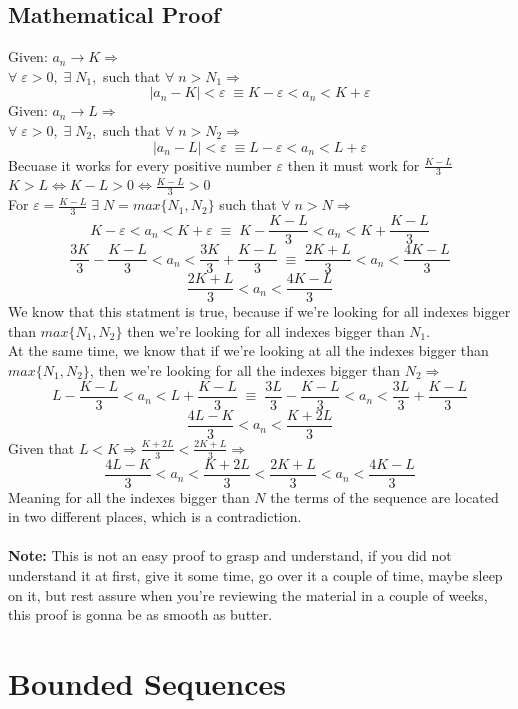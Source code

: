\subsection{Mathematical Proof}
Given: $a_n\rightarrow K \Longrightarrow$\\
$\forall\; \varepsilon>0,\; \exists\; N_1,$ such that $\forall\;n>N_1\Longrightarrow$
\[
    |a_n-K|<\varepsilon\; \equiv K-\varepsilon<a_n<K+\varepsilon
\]
Given: $a_n\rightarrow L \Longrightarrow$\\
$\forall\; \varepsilon>0,\; \exists\; N_2,$ such that $\forall\;n>N_2\Longrightarrow$
\[
    |a_n-L|<\varepsilon\; \equiv L-\varepsilon<a_n<L+\varepsilon
\]
Becuase it works for every positive number $\varepsilon$ then it must work for $\frac{K-L}{3}$\\
$K>L\iff K-L>0\iff \frac{K-L}{3}>0$\\
For $\varepsilon =\frac{K-L}{3}\;\exists\; N=max\{N_1,N_2\}$ such that $\forall\; n>N\Longrightarrow$
\[
    K-\varepsilon<a_n<K+\varepsilon\; \equiv\; K-\frac{K-L}{3}<a_n<K+\frac{K-L}{3}
\]
\[
    \frac{3K}{3}-\frac{K-L}{3}<a_n<\frac{3K}{3}+\frac{K-L}{3}\; \equiv\; \frac{2K+L}{3}<a_n<\frac{4K-L}{3}
\]
\[
    \frac{2K+L}{3}<a_n<\frac{4K-L}{3}
\]
We know that this statment is true, because if we're looking for all indexes bigger than $max\{N_1,N_2\}$ then we're looking for all indexes bigger than $N_1$.\\
At the same time, we know that if we're looking at all the indexes bigger than $max\{N_1,N_2\}$, then we're looking for all the indexes bigger than $N_2\Longrightarrow$
\[
    L-\frac{K-L}{3}<a_n<L+\frac{K-L}{3}\; \equiv\; \frac{3L}{3}-\frac{K-L}{3}<a_n<\frac{3L}{3}+\frac{K-L}{3}
\]
\[
    \frac{4L-K}{3}<a_n<\frac{K+2L}{3}
\]
Given that $L<K \Longrightarrow \frac{K+2L}{3}<\frac{2K+L}{3}\Longrightarrow$
\[
    \frac{4L-K}{3}<a_n<\frac{K+2L}{3}<\frac{2K+L}{3}<a_n<\frac{4K-L}{3}
\]
Meaning for all the indexes bigger than $N$ the terms of the sequence are located in two different places, which is a contradiction.\\\\
\textbf{Note:} This is not an easy proof to grasp and understand, if you did not understand it at first, give it some time, go over it a couple of time, maybe sleep on it, but rest assure when you're reviewing the material in a couple of weeks, this proof is gonna be as smooth as butter.\\


\newpage

\section{Bounded Sequences}
